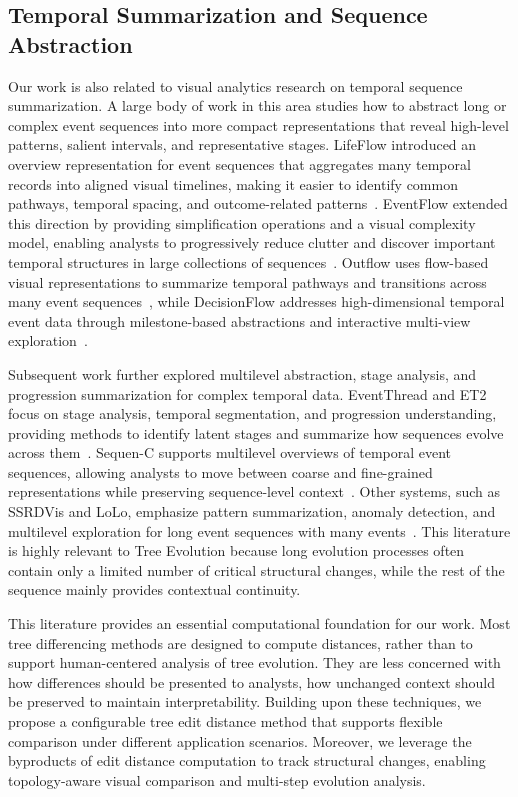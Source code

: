 \subsection{Temporal Summarization and Sequence Abstraction}

Our work is also related to visual analytics research on temporal sequence summarization. A large body of work in this area studies how to abstract long or complex event sequences into more compact representations that reveal high-level patterns, salient intervals, and representative stages. LifeFlow introduced an overview representation for event sequences that aggregates many temporal records into aligned visual timelines, making it easier to identify common pathways, temporal spacing, and outcome-related patterns~\cite{Wongsuphasawat2011LifeFlow}. EventFlow extended this direction by providing simplification operations and a visual complexity model, enabling analysts to progressively reduce clutter and discover important temporal structures in large collections of sequences~\cite{Monroe2013EventFlow}. Outflow uses flow-based visual representations to summarize temporal pathways and transitions across many event sequences~\cite{Wang2014Outflow}, while DecisionFlow addresses high-dimensional temporal event data through milestone-based abstractions and interactive multi-view exploration~\cite{Xu2014DecisionFlow}.

Subsequent work further explored multilevel abstraction, stage analysis, and progression summarization for complex temporal data. EventThread and ET2 focus on stage analysis, temporal segmentation, and progression understanding, providing methods to identify latent stages and summarize how sequences evolve across them~\cite{Zhao2018EventThread,Zhao2018ET2}. Sequen-C supports multilevel overviews of temporal event sequences, allowing analysts to move between coarse and fine-grained representations while preserving sequence-level context~\cite{Wang2022SequenC}. Other systems, such as SSRDVis and LoLo, emphasize pattern summarization, anomaly detection, and multilevel exploration for long event sequences with many events~\cite{Yang2019SSRDVis,Isenberg2025LoLo}. This literature is highly relevant to Tree Evolution because long evolution processes often contain only a limited number of critical structural changes, while the rest of the sequence mainly provides contextual continuity.

This literature provides an essential computational foundation for our work. Most tree differencing methods are designed to compute distances, rather than to support human-centered analysis of tree evolution. They are less concerned with how differences should be presented to analysts, how unchanged context should be preserved to maintain interpretability. Building upon these techniques, we propose a configurable tree edit distance method that supports flexible comparison under different application scenarios. Moreover, we leverage the byproducts of edit distance computation to track structural changes, enabling topology-aware visual comparison and multi-step evolution analysis.


